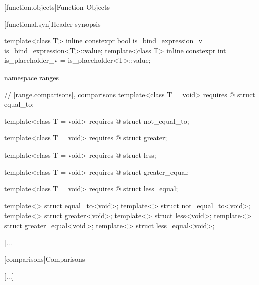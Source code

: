 \setcounter{section}{13}
[function.objects]{Function Objects}

[functional.syn]{Header  synopsis}

\begin{codeblock}
  [...]

  template<class T>
    inline constexpr bool is_bind_expression_v = is_bind_expression<T>::value;
  template<class T>
    inline constexpr int is_placeholder_v = is_placeholder<T>::value;
\end{codeblock}
\begin{addedblock}
\begin{codeblock}

  namespace ranges {
    // \ref{range.comparisons}, comparisons
    template<class T = void>
      requires @\seebelow@
    struct equal_to;

    template<class T = void>
      requires @\seebelow@
    struct not_equal_to;

    template<class T = void>
      requires @\seebelow@
    struct greater;

    template<class T = void>
      requires @\seebelow@
    struct less;

    template<class T = void>
      requires @\seebelow@
    struct greater_equal;

    template<class T = void>
      requires @\seebelow@
    struct less_equal;

    template<> struct equal_to<void>;
    template<> struct not_equal_to<void>;
    template<> struct greater<void>;
    template<> struct less<void>;
    template<> struct greater_equal<void>;
    template<> struct less_equal<void>;
  }
\end{codeblock}
\end{addedblock}
\begin{codeblock}
}
\end{codeblock}

[...]

\setcounter{subsection}{6}
[comparisons]{Comparisons}

[...]


